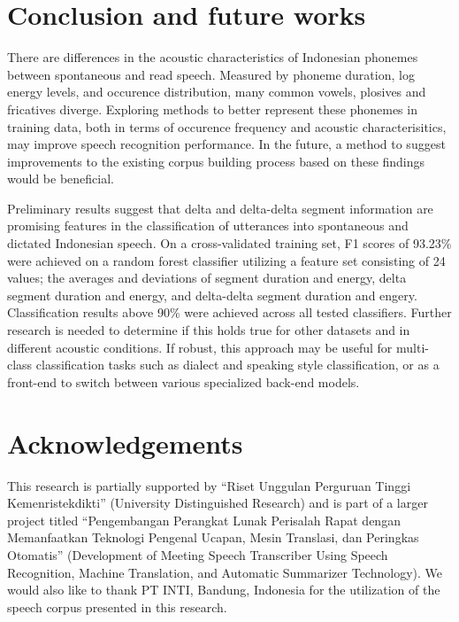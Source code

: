 \documentclass[conference]{IEEEtran}
\begin{document}
\section{Conclusion and future works}

There are differences in the acoustic characteristics of Indonesian phonemes between spontaneous and read speech.
Measured by phoneme duration, log energy levels, and occurence distribution, many common vowels, plosives and fricatives diverge.
Exploring methods to better represent these phonemes in training data, both in terms of occurence frequency and acoustic characterisitics, may improve speech recognition performance.
In the future, a method to suggest improvements to the existing corpus building process based on these findings would be beneficial.

Preliminary results suggest that delta and delta-delta segment information are promising features in the classification of utterances into spontaneous and dictated Indonesian speech.
On a cross-validated training set, F1 scores of 93.23\% were achieved on a random forest classifier utilizing a feature set consisting of 24 values; the averages and deviations of segment duration and energy, delta segment duration and energy, and delta-delta segment duration and engery.
Classification results above 90\% were achieved across all tested classifiers.
Further research is needed to determine if this holds true for other datasets and in different acoustic conditions.
If robust, this approach may be useful for multi-class classification tasks such as dialect and speaking style classification, or as a front-end to switch between various specialized back-end models.

\section*{Acknowledgements}

This research is partially supported by “Riset Unggulan Perguruan Tinggi Kemenristekdikti” (University Distinguished Research) and is part of a larger project titled “Pengembangan Perangkat Lunak Perisalah Rapat dengan Memanfaatkan Teknologi Pengenal Ucapan, Mesin Translasi, dan Peringkas Otomatis” (Development of Meeting Speech Transcriber Using Speech Recognition, Machine Translation, and Automatic Summarizer Technology).
We would also like to thank PT INTI, Bandung, Indonesia for the utilization of the speech corpus presented in this research.
\end{document}
